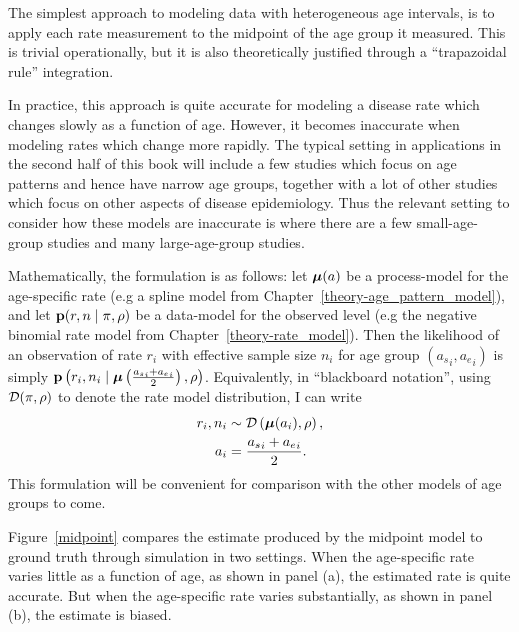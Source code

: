The simplest approach to modeling data with heterogeneous age
intervals, is to apply each rate measurement to the midpoint of the
age group it measured.  This is trivial operationally, but it is also
theoretically justified through a ``trapazoidal rule'' integration.

In practice, this approach is quite accurate for modeling a
disease rate which changes slowly as a function of age.  However, it
becomes inaccurate when modeling rates which change more
rapidly.  The typical setting in applications in the second half of
this book will include a few studies which focus on age patterns and
hence have narrow age groups, together with a lot of other studies
which focus on other aspects of disease epidemiology.  Thus the
relevant setting to consider how these models are inaccurate is where
there are a few small-age-group studies and many large-age-group
studies.

Mathematically, the formulation is as follows: let $\boldsymbol{\mu}(a)$ be a process-model
for the age-specific rate (e.g a spline model from
Chapter~\ref{theory-age_pattern_model}), and let $\mathbf{p}(r,n\;|\; \pi,
\rho)$ be a data-model for the observed level (e.g the negative binomial rate model from
Chapter~\ref{theory-rate_model}).  Then the likelihood of an
observation of rate $r_i$ with effective sample size $n_i$ for age
group $({a_s}_i, {a_e}_i)$ is simply $\mathbf{p}\left(r_i, n_i \;|\;
\boldsymbol{\mu}\left(\frac{{a_s}_i+{a_e}_i}{2}\right),
\rho\right)$. Equivalently, in ``blackboard notation'', using
$\mathcal{D}(\pi, \rho)$ to denote the rate model
distribution, I can write
\begin{align*}
r_i, n_i &\sim \mathcal{D}\left(\boldsymbol{\mu}(a_i), \rho\right),\\
a_i &= \frac{{a_s}_i+{a_e}_i}{2}.
\end{align*}
This formulation will be convenient for comparison with the other models of age groups to come.

Figure~\ref{midpoint} compares the estimate produced by the midpoint
model to ground truth through simulation in two settings.  When the
age-specific rate varies little as a function of age, as shown in
panel (a), the estimated rate is quite accurate.  But when the
age-specific rate varies substantially, as shown in panel (b), the
estimate is biased.


